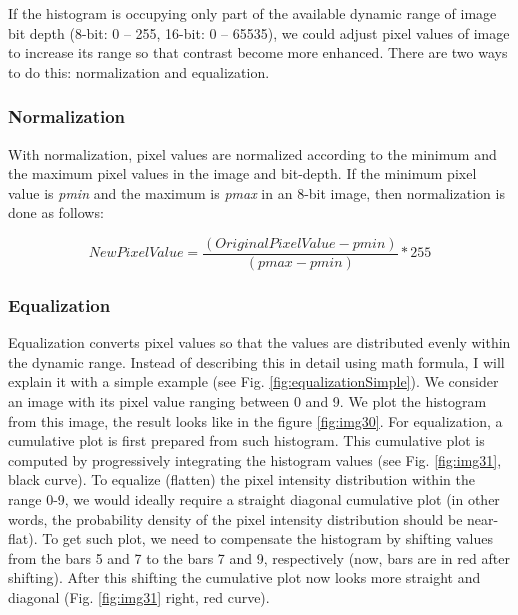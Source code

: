 If the histogram is occupying only part of the available dynamic range
of image bit depth (8-bit: 0 -- 255, 16-bit: 0 -- 65535), we could
adjust pixel values of image to increase its range so that contrast become more
enhanced. There are two ways to do this: normalization and
equalization. 

\subsubsection{Normalization}

With normalization, pixel values are normalized according to the
minimum and the maximum pixel values in the image and bit-depth. If the minimum pixel value is
\textit{pmin} and the maximum is \textit{pmax} in an 8-bit image, then normalization is done as follows:

\begin{equation*}
\mathit{NewPixelValue}=\frac{(\mathit{OriginalPixelValue}-\mathit{pmin})}{(\mathit{pmax}-\mathit{pmin})}\ast
255
\end{equation*}

\subsubsection{Equalization}

Equalization converts pixel values so that the values are distributed
evenly within the dynamic range. Instead of describing this in detail
using math formula, I will explain it with a simple example (see Fig. \ref{fig:equalizationSimple}). 
We consider an image with its pixel value ranging
between 0 and 9. We plot the histogram from this image, the result looks
like in the figure \ref{fig:img30}. For equalization, a cumulative
plot is first prepared from such histogram. This cumulative plot is computed by progressively integrating the histogram values (see 
Fig. \ref{fig:img31}, black curve).
To equalize (flatten) the pixel intensity distribution within the range 0-9, we would ideally require a straight diagonal
cumulative plot (in other words, the probability density of the 
pixel intensity distribution should be near-flat). To get such plot, we need to compensate the histogram by shifting values from the bars 5 and 7 to the bars 7 and 9, respectively (now, bars are in
red after shifting). After this shifting the cumulative plot now looks
more straight and diagonal (Fig. \ref{fig:img31} right, red curve).


